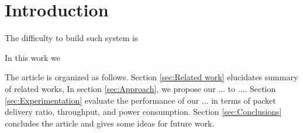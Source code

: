 \section{Introduction} \label{sec:Introduction}





The difficulty to build such system is 


In this work we 

The article is organized as follows.
Section \ref{sec:Related work} elucidates summary of related works,
In section \ref{sec:Approach}, we propose our ... to ....
Section \ref{sec:Experimentation} evaluate the performance of our ... in terms of packet delivery ratio,
	throughput,
	and power consumption.
Section \ref{sec:Conclusions} concludes the article and gives some ideas for future work.





